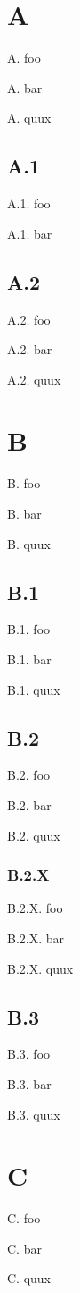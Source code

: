 \documentclass[11pt]{article}
\begin{document}
    \section{A}

    A. foo

    A. bar

    A. quux

    \subsection{A.1}

    A.1. foo

    A.1. bar

    \subsection{A.2}

    A.2. foo

    A.2. bar

    A.2. quux

    \section{B}

    B. foo

    B. bar

    B. quux

    \subsection{B.1}

    B.1. foo

    B.1. bar

    B.1. quux

    \subsection{B.2}

    B.2. foo

    B.2. bar

    B.2. quux

    \subsubsection{B.2.X}

    B.2.X. foo

    B.2.X. bar

    B.2.X. quux

    \subsection{B.3}

    B.3. foo

    B.3. bar

    B.3. quux

    \section{C}

    C. foo

    C. bar

    C. quux
\end{document}
